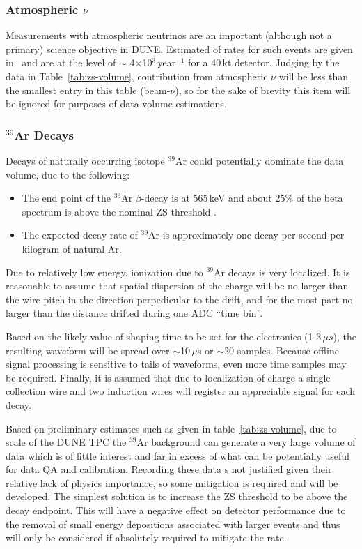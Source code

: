 \subsubsection{Atmospheric $\nu$}
\label{sec:atmo-nu}
Measurements with atmospheric neutrinos are an important (although not a primary) science objective in DUNE.
Estimated of rates for such events are given in~\cite{sciopps,cdr_vol2} and are at the level of $\sim$
4$\times$10$^3$\,year$^{-1}$ for a 40\,kt detector. Judging by the data in Table~\ref{tab:zs-volume},
contribution from atmospheric $\nu$ will be less than the smallest entry in this table \mbox{(beam-$\nu$)}, so for the sake
of brevity this item will be ignored for purposes of data volume estimations.

\subsubsection{$^{39}$Ar Decays}
\label{sec:ar39decays}
Decays of naturally occurring isotope $^{39}$Ar could potentially dominate the data volume,
due to the following:
\begin{itemize}
\item The end point of the $^{39}$Ar $\beta$-decay is at 565\,keV and about
25\% of the beta spectrum is above the nominal ZS threshold \cite{ar39endpoint}.

\item The expected decay rate of $^{39}$Ar is approximately one decay per second per kilogram of natural Ar\cite{ar39bkg}.
\end{itemize}
\noindent
Due to relatively low energy, ionization due to $^{39}$Ar decays is very localized.
It is reasonable to assume that spatial dispersion of the charge will be no larger than the wire pitch
in the direction perpedicular to the drift, and for the most part no larger than the distance drifted
during one ADC ``time bin''.

Based on the likely value of shaping time to be set for the electronics (1-3\,${\mu}s$),
the resulting waveform will be spread over $\sim$10\,$\mu$s or $\sim$20 samples. Because offline signal
processing is sensitive to tails of waveforms, even more time samples may be required.
Finally, it is assumed that due to localization of charge a single collection wire and two induction
wires will register an appreciable signal for each decay.

Based on preliminary estimates such as given in table~\ref{tab:zs-volume},
due to scale of the DUNE TPC the $^{39}$Ar background can generate a very large volume
of data which is of little interest and far in excess of what can be potentially useful for data QA and
calibration. Recording these data s not justified given their relative lack
of physics importance, so some mitigation is required and will be developed. The simplest solution
is to increase the ZS threshold to be above the decay endpoint.
This will have a negative effect on detector performance due to the removal of small energy
depositions associated with larger events and thus will only be
considered if absolutely required to mitigate the rate.

